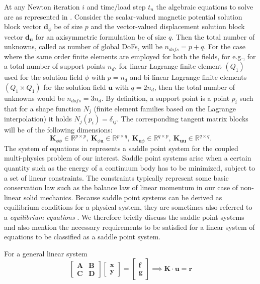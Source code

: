 At any Newton iteration $i$ and time/load step $t_n$ the algebraic equations to solve are as represented in . Consider the scalar-valued magnetic potential solution block vector $\mathbf{d}_{\phi}$ be of size $p$ and the vector-valued displacement solution block vector $\mathbf{d}_{\mathbf{u}}$ for an axisymmetric formulation be of size $q$. Then the total number of unknowns, called as number of global DoFs, will be $n_{dofs} = p + q$. For the case where the same order finite elements are employed for both the fields, for e.g., for a total number of support points $n_d$, for linear Lagrange finite element $(Q_1)$ used for the solution field $\phi$ with $p = n_d$ and bi-linear Lagrange finite elements $(Q_1 \times Q_1)$ for the solution field $\mathbf{u}$ with $q = 2 n_d$, then the total number of unknowns would be $n_{dofs} = 3 n_d$. By definition, a support point is a point $p_i$ such that for a shape function $N_j$ (finite element families based on the Lagrange interpolation) it holds $N_j (p_i) = \delta_{ij}$. The corresponding tangent matrix blocks will be of the following dimensions:
\begin{equation}
\mathbf{K}_{\phi \phi} \in \mathbb{R}^{p \times p}, \ \mathbf{K}_{\phi \mathbf{u}} \in \mathbb{R}^{p \times q}, \ \mathbf{K}_{\mathbf{u} \phi} \in \mathbb{R}^{q \times p}, \ \mathbf{K}_{\mathbf{u} \mathbf{u}} \in \mathbb{R}^{q \times q}.
\end{equation}
The system of equations in  represents a saddle point system for the coupled multi-physics problem of our interest. Saddle point systems arise when a certain quantity such as the energy of a continuum body has to be minimized, subject to a set of linear constraints. The constraints typically represent some basic conservation law such as the balance law of linear momentum in our case of non-linear solid mechanics. Because saddle point systems can be derived as equilibrium conditions for a physical system, they are sometimes also referred to a \textit{equilibrium equations} \cite{Benzi2005}. We therefore briefly discuss the saddle point systems and also mention the necessary requirements to be satisfied for a linear system of equations to be classified as a saddle point system. \newline \par 
For a general linear system 
\begin{equation}
\begin{bmatrix}
\mathbf{A} & \mathbf{B} \\
\mathbf{C} & \mathbf{D}
\end{bmatrix}
\begin{bmatrix}
\mathbf{x} \\
\mathbf{y}
\end{bmatrix}
=
\begin{bmatrix}
\mathbf{f} \\
\mathbf{g}
\end{bmatrix}
\implies \mathbf{K} \cdot \mathbf{u} = \mathbf{r}
\label{eq:3.11}
\end{equation}

